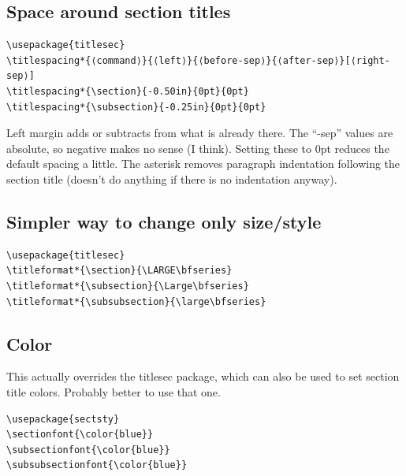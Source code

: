 \documentclass{article}
\begin{document}
\subsection{Space around section titles}
\begin{minipage}[t]{\textwidth}
\begin{lstlisting}
\usepackage{titlesec}
\titlespacing*{⟨command⟩}{⟨left⟩}{⟨before-sep⟩}{⟨after-sep⟩}[⟨right-sep⟩]
\titlespacing*{\section}{-0.50in}{0pt}{0pt}
\titlespacing*{\subsection}{-0.25in}{0pt}{0pt}
\end{lstlisting}
\end{minipage}
\begin{minipage}[t]{\textwidth}
    Left margin adds or subtracts from what is already there. The ``-sep'' values
    are absolute, so negative makes no sense (I think). Setting these to 0pt
    reduces the default spacing a little. The asterisk removes paragraph
    indentation following the section title (doesn't do anything if there
    is no indentation anyway).
\end{minipage}

\subsection{Simpler way to change only size/style}
\begin{lstlisting}
\usepackage{titlesec}
\titleformat*{\section}{\LARGE\bfseries}
\titleformat*{\subsection}{\Large\bfseries}
\titleformat*{\subsubsection}{\large\bfseries}
\end{lstlisting}

\subsection{Color}
This actually overrides the titlesec package, which can also be used
to set section title colors. Probably better to use that one.
\begin{lstlisting}
\usepackage{sectsty}
\sectionfont{\color{blue}}
\subsectionfont{\color{blue}}
\subsubsectionfont{\color{blue}}
\end{lstlisting}
\end{document}
